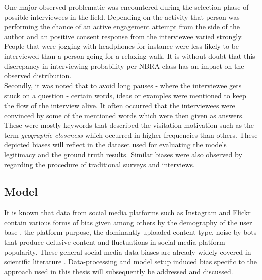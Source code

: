 One major observed problematic was encountered during the selection phase of possible interviewees in the field. Depending on the activity that person was performing the chance of an active engagement attempt from the side of the author and an positive consent response from the interviewee varied strongly. People that were jogging with headphones for instance were less likely to be interviewed than a person going for a relaxing walk. It is without doubt that this discrepancy in interviewing probability per NBRA-class has an impact on the observed distribution.\\

Secondly, it was noted that to avoid long pauses - where the interviewee gets stuck on a question - certain words, ideas or examples were mentioned to keep the flow of the interview alive. It often occurred that the interviewees were convinced by some of the mentioned words which were then given as answers. These were mostly keywords that described the visitation motivation such as the term \textit{geographic closeness} which occurred in higher frequencies than others. These depicted biases will reflect in the dataset used for evaluating the models legitimacy and the ground truth results. Similar biases were also observed by \textcite{Hanemann2011, Kling2012, Tenerelli2016} regarding the procedure of traditional surveys and interviews.

\subsection{Model}
It is known that data from social media platforms such as Instagram and Flickr contain various forms of bias given among others by the demography of the user base \parencite{Heikinheimo2017}, the platform purpose, the dominantly uploaded content-type, noise by bots that produce delusive content \parencite{Edwards2014} and fluctuations in social media platform popularity. These general social media data biases are already widely covered in scientific literature \parencite{Ruths2014, Lazer2014, Zook2017}. Data-processing and model setup induced bias specific to the approach used in this thesis will subsequently be addressed and discussed. \\

